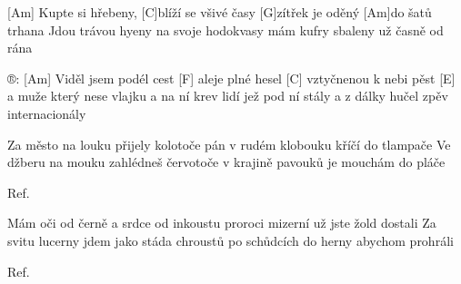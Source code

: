 
[Am] Kupte si hřebeny, [C]blíží se všivé časy	
[G]zítřek je oděný [Am]do šatů trhana
Jdou trávou hyeny na svoje hodokvasy
mám kufry sbaleny už časně od rána

®:	[Am]	Viděl jsem podél cest [F] aleje plné hesel	
[C] vztyčnenou k nebi pěst [E] a muže který nese	
vlajku a na ní krev lidí jež pod ní stály
a z dálky hučel zpěv internacionály

Za město na louku přijely kolotoče
pán v rudém klobouku kříčí do tlampače
Ve džberu na mouku zahlédneš červotoče
v krajině pavouků je mouchám do pláče

Ref.

Mám oči od černě a srdce od inkoustu
proroci mizerní už jste žold dostali
Za svitu lucerny jdem jako stáda chroustů
po schůdcích do herny abychom prohráli 

Ref.
